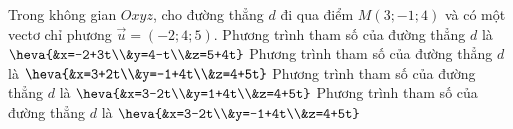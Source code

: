 \begin{ex}%
	Trong không gian $Oxyz$, cho đường thẳng $d$ đi qua điểm $M(3;-1;4)$ và có một vectơ chỉ phương $\vec{u}=(-2;4;5)$. 
	\choiceTF
	{Phương trình tham số của đường thẳng $d$ là $\heva{&x=-2+3t\\&y=4-t\\&z=5+4t}$}
	{Phương trình tham số của đường thẳng $d$ là $\heva{&x=3+2t\\&y=-1+4t\\&z=4+5t}$}
	{Phương trình tham số của đường thẳng $d$ là $\heva{&x=3-2t\\&y=1+4t\\&z=4+5t}$}
	{\True Phương trình tham số của đường thẳng $d$ là $\heva{&x=3-2t\\&y=-1+4t\\&z=4+5t}$}
\end{ex}

